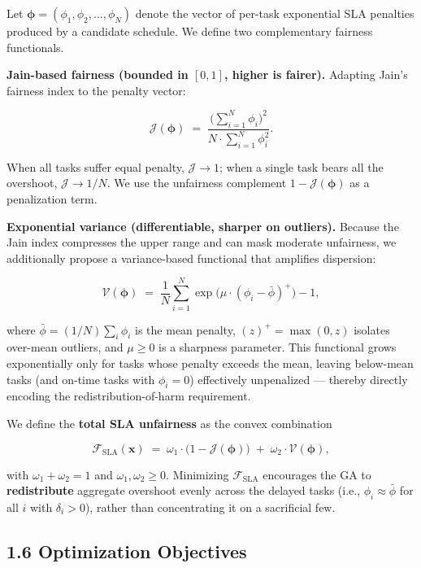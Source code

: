 \documentclass[11pt,a4paper]{article}
\begin{document}
Let $\boldsymbol{\phi} = (\phi_1, \phi_2, \ldots, \phi_N)$ denote the vector of per-task exponential SLA penalties produced by a candidate schedule. We define two complementary fairness functionals.

\textbf{Jain-based fairness (bounded in $[0,1]$, higher is fairer).} Adapting Jain's fairness index to the penalty vector:

$$
\mathcal{J}(\boldsymbol{\phi}) \;=\; \frac{\Big( \sum_{i=1}^{N} \phi_i \Big)^2}{N \cdot \sum_{i=1}^{N} \phi_i^2}.
$$

When all tasks suffer equal penalty, $\mathcal{J} \to 1$; when a single task bears all the overshoot, $\mathcal{J} \to 1/N$. We use the unfairness complement $1 - \mathcal{J}(\boldsymbol{\phi})$ as a penalization term.

\textbf{Exponential variance (differentiable, sharper on outliers).} Because the Jain index compresses the upper range and can mask moderate unfairness, we additionally propose a variance-based functional that amplifies dispersion:

$$
\mathcal{V}(\boldsymbol{\phi}) \;=\; \frac{1}{N} \sum_{i=1}^{N} \exp\!\Big( \mu \cdot (\phi_i - \bar{\phi})^{+} \Big) - 1,
$$

where $\bar{\phi} = (1/N) \sum_i \phi_i$ is the mean penalty, $(z)^{+} = \max(0,z)$ isolates over-mean outliers, and $\mu \geq 0$ is a sharpness parameter. This functional grows exponentially only for tasks whose penalty exceeds the mean, leaving below-mean tasks (and on-time tasks with $\phi_i = 0$) effectively unpenalized — thereby directly encoding the redistribution-of-harm requirement.

We define the \textbf{total SLA unfairness} as the convex combination

$$
\mathcal{F}_{\text{SLA}}(\mathbf{x}) \;=\; \omega_1 \cdot \big(1 - \mathcal{J}(\boldsymbol{\phi})\big) \;+\; \omega_2 \cdot \mathcal{V}(\boldsymbol{\phi}),
$$

with $\omega_1 + \omega_2 = 1$ and $\omega_1, \omega_2 \geq 0$. Minimizing $\mathcal{F}_{\text{SLA}}$ encourages the GA to \textbf{redistribute} aggregate overshoot evenly across the delayed tasks (i.e., $\phi_i \approx \bar{\phi}$ for all $i$ with $\delta_i > 0$), rather than concentrating it on a sacrificial few.

\subsection*{1.6 Optimization Objectives}
\end{document}
